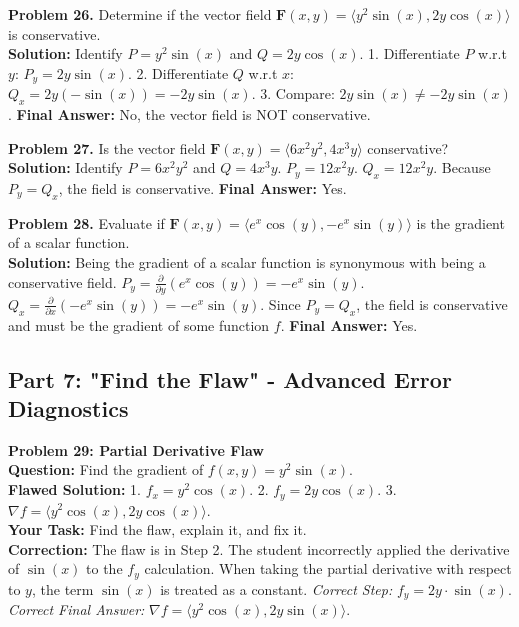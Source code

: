 \documentclass[11pt]{article}
\begin{document}
\vspace{0.3cm}
\textbf{Problem 26.} Determine if the vector field $\mathbf{F}(x,y) = \langle y^2 \sin(x), 2y \cos(x) \rangle$ is conservative. \\
\textbf{Solution:}
Identify $P = y^2 \sin(x)$ and $Q = 2y \cos(x)$.
1. Differentiate $P$ w.r.t $y$: $P_y = 2y \sin(x)$.
2. Differentiate $Q$ w.r.t $x$: $Q_x = 2y(-\sin(x)) = -2y \sin(x)$.
3. Compare: $2y \sin(x) \neq -2y \sin(x)$.
\textbf{Final Answer:} No, the vector field is NOT conservative.

\vspace{0.3cm}
\textbf{Problem 27.} Is the vector field $\mathbf{F}(x,y) = \langle 6x^2 y^2, 4x^3 y \rangle$ conservative? \\
\textbf{Solution:}
Identify $P = 6x^2 y^2$ and $Q = 4x^3 y$.
$P_y = 12x^2 y$.
$Q_x = 12x^2 y$.
Because $P_y = Q_x$, the field is conservative.
\textbf{Final Answer:} Yes.

\vspace{0.3cm}
\textbf{Problem 28.} Evaluate if $\mathbf{F}(x,y) = \langle e^x \cos(y), -e^x \sin(y) \rangle$ is the gradient of a scalar function. \\
\textbf{Solution:}
Being the gradient of a scalar function is synonymous with being a conservative field.
$P_y = \frac{\partial}{\partial y}(e^x \cos(y)) = -e^x \sin(y)$.
$Q_x = \frac{\partial}{\partial x}(-e^x \sin(y)) = -e^x \sin(y)$.
Since $P_y = Q_x$, the field is conservative and must be the gradient of some function $f$.
\textbf{Final Answer:} Yes.

\subsection*{Part 7: "Find the Flaw" - Advanced Error Diagnostics}

\textbf{Problem 29: Partial Derivative Flaw} \\
\textbf{Question:} Find the gradient of $f(x,y) = y^2 \sin(x)$. \\
\textbf{Flawed Solution:} 
1. $f_x = y^2 \cos(x)$. 
2. $f_y = 2y \cos(x)$. 
3. $\nabla f = \langle y^2 \cos(x), 2y \cos(x) \rangle$. \\
\textbf{Your Task:} Find the flaw, explain it, and fix it. \\
\textbf{Correction:} 
The flaw is in Step 2. The student incorrectly applied the derivative of $\sin(x)$ to the $f_y$ calculation. When taking the partial derivative with respect to $y$, the term $\sin(x)$ is treated as a constant.
\textit{Correct Step:} $f_y = 2y \cdot \sin(x)$.
\textit{Correct Final Answer:} $\nabla f = \langle y^2 \cos(x), 2y \sin(x) \rangle$.
\end{document}
